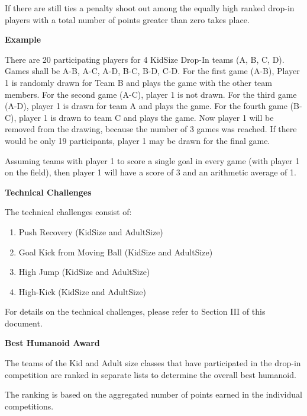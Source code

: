 If there are still ties a penalty shoot out among the equally high ranked drop-in players with a total number of points greater than zero takes place.

\bigskip 
 
{\bfseries Example}
 
There are 20 participating players for 4 KidSize Drop-In teams (A, B, C, D). Games shall be A-B, A-C, A-D, B-C, B-D, C-D. For the first game (A-B), Player 1 is randomly drawn for Team B and plays the game with the other team members. For the second game (A-C), player 1 is not drawn. For the third game (A-D), player 1 is drawn for team A and plays the game. For the fourth game (B-C), player 1 is drawn to team C and plays the game. Now player 1 will be removed from the drawing, because the number of 3 games was reached. If there would be only 19 participants, player 1 may be drawn for the final game.

Assuming teams with player 1 to score a single goal in every game (with player 1 on the field), then player 1 will have a score of 3 and an arithmetic average of 1.

\bigskip

{\bfseries Technical Challenges}

\headlinebox

The technical challenges consist of:

\begin{enumerate}
\item Push Recovery (KidSize and AdultSize)
\item Goal Kick from Moving Ball (KidSize and AdultSize)
\item High Jump (KidSize  and AdultSize)
\item High-Kick (KidSize and AdultSize)
\end{enumerate}

For details on the technical challenges, please refer to Section III of this document.

\bigskip

\newpage
{\bfseries Best Humanoid Award}

\headlinebox
 
The teams of the Kid and Adult size classes that have
participated in the drop-in competition are ranked in separate lists to
determine the overall best humanoid.

The ranking is based on the aggregated number of points earned in the individual competitions.


